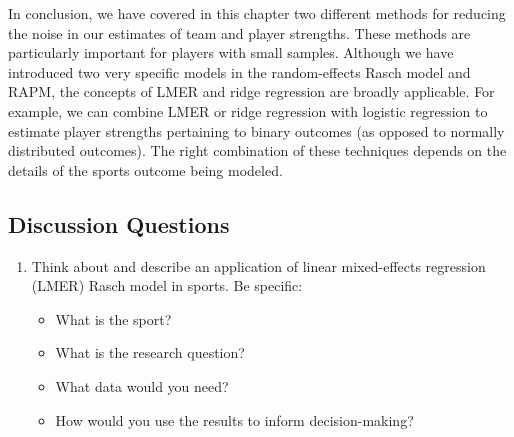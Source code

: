 \documentclass{article}
\begin{document}
  In conclusion, we have covered in this chapter two different methods for reducing the noise in our estimates of team and player strengths. These methods are particularly important for players with small samples. Although we have introduced two very specific models in the random-effects Rasch model and RAPM, the concepts of LMER and ridge regression are broadly applicable. For example, we can combine LMER or ridge regression with logistic regression to estimate player strengths pertaining to binary outcomes (as opposed to normally distributed outcomes). The right combination of these techniques depends on the details of the sports outcome being modeled.

  \subsection{\sc Discussion Questions}

    \begin{enumerate}
      \item Think about and describe an application of linear mixed-effects regression (LMER) Rasch model in sports. Be specific:
      \begin{itemize}
        \item What is the sport?
        \item What is the research question?
        \item What data would you need?
        \item How would you use the results to inform decision-making?
      \end{itemize}
    \end{enumerate}
\end{document}
